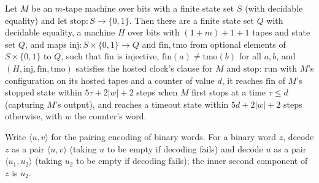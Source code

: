 \begin{theorem}
\label{Turing.NTimeDiag.dz_clock_exists}
\leanok
{}
Let $M$ be an $m$-tape machine over bits with a finite state set $S$ (with decidable equality) and
let $\mathrm{stop} : S \to \{0, 1\}$. Then there are a finite state set $Q$ with decidable
equality, a machine $H$ over bits with $(1 + m) + 1 + 1$ tapes and state set $Q$, and maps
$\mathrm{inj} : S \times \{0, 1\} \to Q$ and $\mathrm{fin}, \mathrm{tmo}$ from optional elements of
$S \times \{0, 1\}$ to $Q$, such that $\mathrm{fin}$ is injective, $\mathrm{fin}(a) \ne
\mathrm{tmo}(b)$ for all $a, b$, and $(H, \mathrm{inj}, \mathrm{fin}, \mathrm{tmo})$ satisfies the
hosted clock's clause for $M$ and $\mathrm{stop}$: run with $M$'s configuration on its hosted tapes
and a counter of value $d$, it reaches $\mathrm{fin}$ of $M$'s stopped state within $5\tau + 2|w| +
2$ steps when $M$ first stops at a time $\tau \le d$ (capturing $M$'s output), and reaches a
timeout state within $5d + 2|w| + 2$ steps otherwise, with $w$ the counter's word.
\end{theorem}

\begin{definition}
\label{Turing.NTimeDiag.dzAlpha}
\leanok
{}
Write $\langle u, v\rangle$ for the pairing encoding of binary words. For a binary word $z$, decode
$z$ as a pair $\langle u, v\rangle$ (taking $u$ to be empty if decoding fails) and decode $u$ as a
pair $\langle u_1, u_2\rangle$ (taking $u_2$ to be empty if decoding fails); the inner second
component of $z$ is $u_2$.
\end{definition}


